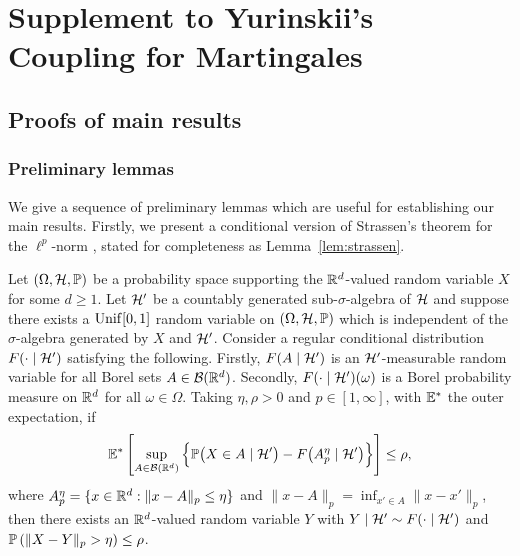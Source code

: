 
\chapter[Supplement to Yurinskii's Coupling for Martingales]%
{Supplement to Yurinskii's \\ Coupling for Martingales}
\label{app:yurinskii}

\section{Proofs of main results}
\label{sec:yurinskii_proofs}

\subsection{Preliminary lemmas}

We give a sequence of preliminary lemmas which are useful for establishing our
main results. Firstly, we present a conditional version of Strassen's theorem
for the $\ell^p$-norm \citep[Theorem~B.2]{chen2020jackknife}, stated for
completeness as Lemma~\ref{lem:strassen}.

\begin{lemma}%
  \label{lem:strassen}
  Let $(\Omega, \cH, \P)$ be a probability space supporting the $\R^d$-valued
  random variable $X$ for some $d \geq 1$. Let $\cH'$ be a countably generated
  sub-$\sigma$-algebra of $\cH$ and suppose there exists a $\Unif[0,1]$ random
  variable on $(\Omega, \cH, \P)$ which is independent of the $\sigma$-algebra
  generated by $X$ and $\cH'$. Consider a regular conditional distribution
  $F(\cdot \mid \cH')$ satisfying the following. Firstly, $F(A \mid \cH')$ is
  an $\cH'$-measurable random variable for all Borel sets $A \in \cB(\R^d)$.
  Secondly, $F(\cdot \mid \cH')(\omega)$ is a Borel probability measure on
  $\R^d$ for all $\omega \in \Omega$. Taking $\eta, \rho > 0$ and
  $p \in [1, \infty]$, with $\E^*$ the outer expectation, if
  \begin{align*}
    \E^* \left[
      \sup_{A \in \cB(\R^d)}
      \Big\{
        \P \big( X \in A \mid \cH' \big)
        - F \big( A_p^\eta \mid \cH' \big)
      \Big\}
    \right]
    \leq \rho,
  \end{align*}
  where $A_p^\eta = \{x \in \R^d : \|x - A\|_p \leq \eta\}$
  and $\|x - A\|_p = \inf_{x' \in A} \|x - x'\|_p$,
  then there exists an $\R^d$-valued random variable $Y$
  with $Y \mid \cH' \sim F(\cdot \mid \cH')$
  and $\P \left( \|X-Y\|_p > \eta \right) \leq \rho$.
\end{lemma}

